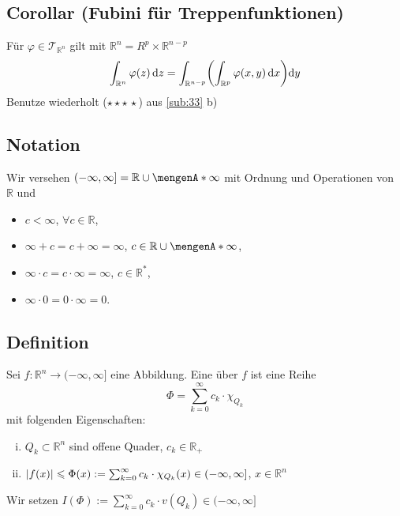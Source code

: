 \subsection{Corollar (Fubini für Treppenfunktionen)} %
\label{sub:34}
Für $\varphi \in \mathcal{T}_{\mathds{R}^n}$ gilt mit $\mathds{R}^n = R^{p} \times \mathds{R}^{n-p} $
\[
	\int_{\mathds{R}^n} \varphi(z)  \, \mathrm{d}z = \int_{\mathds{R}^{n-p}} \enbrace*{\int_{\mathds{R}^p} \varphi(x,y)  \, \mathrm{d}x } \mathrm{d}y
\]
Benutze wiederholt ($\star\star\star\,\star$) aus \ref{sub:33} b) \bewende

\subsection[Notation für den Funktionswert $\infty$]{Notation} %
\label{sub:35}
Wir versehen $(- \infty, \infty] = \mathds{R} \cup \set{\infty} $ mit Ordnung und Operationen von $\mathds{R}$ und 
\begin{multicols}{2}
	\begin{itemize}
		\item $c < \infty$, $\forall c \in \mathds{R}$,
		\item $\infty+c = c + \infty = \infty$, $c \in \mathds{R} \cup \set{\infty} $,
		\item $\infty \cdot c = c \cdot \infty = \infty$, $c \in \mathds{R}^*$,
		\item $\infty \cdot  0 = 0 \cdot \infty = 0$.
	\end{itemize}
\end{multicols}

\subsection[Definition: Treppe]{Definition} %
\label{sub:36}
Sei $f : \mathds{R}^n \to (- \infty, \infty]$ eine Abbildung. Eine  über $f$ ist eine Reihe
\[
	\Phi = \sum_{k=0}^{\infty} c_k \cdot \chi_{Q_k}
\] 
mit folgenden Eigenschaften: 
\begin{enumerate}[(i)]
	\item $Q_k \subset \mathds{R}^n$ sind offene Quader, $c_k \in \mathds{R}_+$
	\item $\abs*{f(x)} \le \Phi(x) := \sum_{k=0}^{\infty} c_k \cdot \chi_{Q_k}(x)  \in (- \infty, \infty] $, $x \in \mathds{R}^n$
\end{enumerate}
Wir setzen $I(\Phi) := \sum_{k=0}^{\infty} c_k \cdot v(Q_k) \in (- \infty, \infty]$ 

